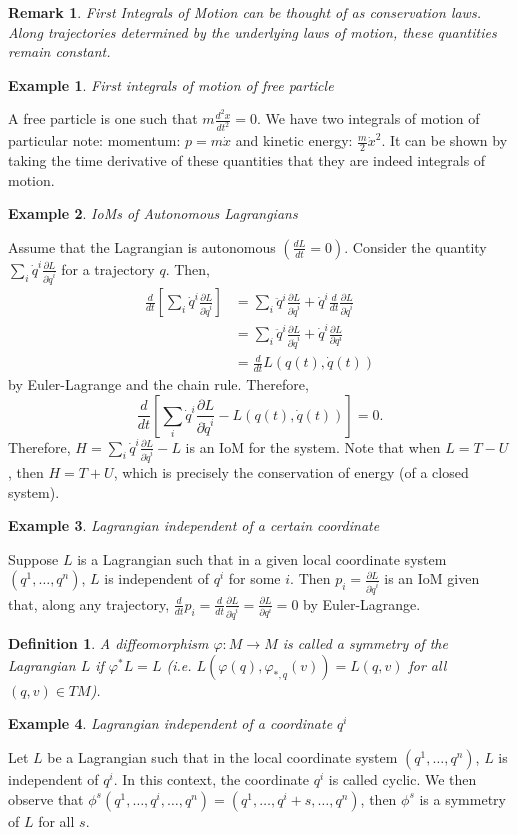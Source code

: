 \documentclass{article}
\newcommand{\nl}{\newline\newline\noindent}
\newcommand{\vhi}{\varphi}
\newcommand{\pdof}[2]{\frac{\partial #1}{\partial #2}}
\newtheorem{ex}{Example}
\newtheorem{defn}{Definition}
\newtheorem{rmk}{Remark}
\begin{document}
\begin{rmk}
    First Integrals of Motion can be thought of as conservation laws. Along trajectories determined by the underlying laws of motion, these quantities remain constant.
\end{rmk}
\begin{ex}
    First integrals of motion of free particle
\end{ex}
\noindent A free particle is one such that $m\frac{d^2x}{dt^2} = 0$. We have two integrals of motion of particular note: momentum: $p=m\dot x$ and kinetic energy: $\frac{m}{2}\dot x^2$. It can be shown by taking the time derivative of these quantities that they are indeed integrals of motion.
\begin{ex}
    IoMs of Autonomous Lagrangians
\end{ex}
\noindent Assume that the Lagrangian is autonomous $(\frac{dL}{dt} = 0)$. Consider the quantity $\sum_i \dot q^i\pdof{L}{\dot q^i}$ for a trajectory $q$. Then,
\begin{align*}
    \frac{d}{dt}\left[\sum_i \dot q^i\pdof{L}{\dot q^i}\right]&=\sum_{i}\ddot q^i\pdof{L}{\dot q^i} + \dot q^i\frac{d}{dt}\pdof{L}{\dot q^i}\\
    &=\sum_{i}\ddot q^i\pdof{L}{\dot q^i} + \dot q^i\pdof{L}{q^i}\\
    &=\frac{d}{dt}L(q(t),\dot q(t))
\end{align*}
by Euler-Lagrange and the chain rule. Therefore,
\[\frac{d}{dt}\left[\sum_i\dot q^i\pdof{L}{\dot q^i} - L(q(t),\dot q(t))\right] = 0.\]
Therefore, $H = \sum_i\dot q^i\pdof{L}{\dot q^i} - L$ is an IoM for the system. Note that when $L=T-U$, then $H = T+U$, which is precisely the conservation of energy (of a closed system).
\begin{ex}
    Lagrangian independent of a certain coordinate
\end{ex}
\noindent Suppose $L$ is a Lagrangian such that in a given local coordinate system $(q^1,\dots,q^n)$, $L$ is independent of $q^i$ for some $i$. Then $p_i = \pdof{L}{\dot q^i}$ is an IoM given that, along any trajectory, $\frac{d}{dt}p_i = \frac{d}{dt}\pdof{L}{\dot q^i} = \pdof{L}{q^i} = 0$ by Euler-Lagrange.
\nl
\begin{defn}
    A diffeomorphism $\vhi:M\to M$ is called a symmetry of the Lagrangian $L$ if $\vhi^*L = L$ (i.e. $L(\vhi(q),\vhi_{*,q}(v)) = L(q,v)$ for all $(q,v)\in TM$).
\end{defn}
\begin{ex}
    Lagrangian independent of a coordinate $q^i$
\end{ex}
\noindent Let $L$ be a Lagrangian such that in the local coordinate system $(q^1,\dots,q^n)$, $L$ is independent of $q^i$. In this context, the coordinate $q^i$ is called cyclic. We then observe that $\phi^s(q^1,\dots,q^i,\dots,q^n) = (q^1,\dots,q^i+s,\dots,q^n)$, then $\phi^s$ is a symmetry of $L$ for all $s$.
\end{document}
